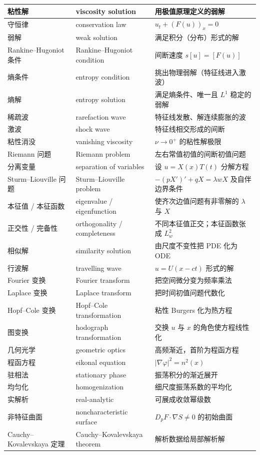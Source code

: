 \documentclass[UTF8,11pt,a4paper]{ctexart}
\begin{document}
\begin{longtable}{@{}>{\raggedright\arraybackslash}p{3.0cm}>{\raggedright\arraybackslash}p{5.0cm}>{\raggedright\arraybackslash}p{6.4cm}@{}}
\hline
粘性解 & viscosity solution & 用极值原理定义的弱解 \\
\hline
守恒律 & conservation law & $u_t+(F(u))_x=0$ \\
\hline
弱解 & weak solution & 满足积分（分布）形式的解 \\
\hline
Rankine--Hugoniot 条件 & Rankine--Hugoniot condition & 间断速度 $s[u]=[F(u)]$ \\
\hline
熵条件 & entropy condition & 挑出物理弱解（特征线进入激波） \\
\hline
熵解 & entropy solution & 满足熵条件、唯一且 $L^1$ 稳定的弱解 \\
\hline
稀疏波 & rarefaction wave & 特征线发散、解连续膨胀的波 \\
\hline
激波 & shock wave & 特征线相交形成的间断 \\
\hline
粘性消没 & vanishing viscosity & $\nu\to0^+$ 的粘性解极限 \\
\hline
Riemann 问题 & Riemann problem & 左右常值初值的间断初值问题 \\
\hline
分离变量 & separation of variables & 设 $u=X(x)T(t)$ 分解方程 \\
\hline
Sturm--Liouville 问题 & Sturm--Liouville problem & $-(pX')'+qX=\lambda wX$ 及自伴边界条件 \\
\hline
本征值 / 本征函数 & eigenvalue / eigenfunction & 使齐次边值问题有非零解的 $\lambda$ 与 $X$ \\
\hline
正交性 / 完备性 & orthogonality / completeness & 不同本征值正交；本征函数张成 $L^2_w$ \\
\hline
相似解 & similarity solution & 由尺度不变性把 PDE 化为 ODE \\
\hline
行波解 & travelling wave & $u=U(x-ct)$ 形式的解 \\
\hline
Fourier 变换 & Fourier transform & 把空间微分变为频率乘法 \\
\hline
Laplace 变换 & Laplace transform & 把时间初值问题代数化 \\
\hline
Hopf--Cole 变换 & Hopf--Cole transformation & 粘性 Burgers 化为热方程 \\
\hline
图变换 & hodograph transformation & 交换 $u$ 与 $x$ 的角色使方程线性化 \\
\hline
几何光学 & geometric optics & 高频渐近，首阶为程函方程 \\
\hline
程函方程 & eikonal equation & $|\nabla\varphi|^2=n^2(x)$ \\
\hline
驻相法 & stationary phase & 振荡积分的渐近展开 \\
\hline
均匀化 & homogenization & 细尺度振荡系数的平均化 \\
\hline
实解析 & real-analytic & 可展成收敛幂级数 \\
\hline
非特征曲面 & noncharacteristic surface & $D_pF\cdot\nabla S\ne0$ 的初始曲面 \\
\hline
Cauchy--Kovalevskaya 定理 & Cauchy--Kovalevskaya theorem & 解析数据给局部解析解 \\
\hline
\end{longtable}
\normalsize
\end{document}
